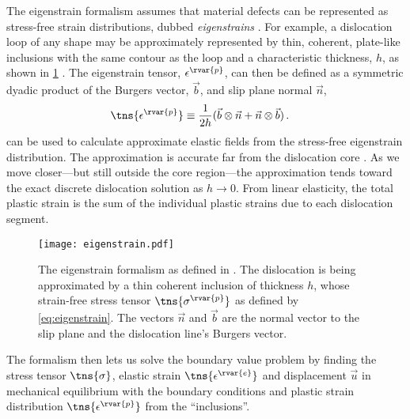 The eigenstrain formalism assumes that material defects can be represented as stress-free strain distributions, dubbed \emph{eigenstrains} \cite{eigenstrain}. For example, a dislocation loop of any shape may be approximately represented by thin, coherent, plate-like inclusions with the same contour as the loop and a characteristic thickness, $ h $, as shown in \cref{f:eigenstrain} \cite{dcm}. The eigenstrain tensor, $ \epsilon^{\rvar{p}} $, can then be defined as a symmetric dyadic product of the Burgers vector, $ \vec{b} $, and slip plane normal $ \vec{n} $,
\begin{align}\label{eq:eigenstrain}
    \tns{\epsilon^{\rvar{p}}} & \equiv \dfrac{1}{2h} (\vec{b} \otimes \vec{n} + \vec{n} \otimes \vec{b})\,.
\end{align}
 can be used to calculate approximate elastic fields from the stress-free eigenstrain distribution. The approximation is accurate far from the dislocation core \cite{dln_core}. As we move closer---but still outside the core region---the approximation tends toward the exact discrete dislocation solution as $ h \to 0$. From linear elasticity, the total plastic strain is the sum of the individual plastic strains due to each dislocation segment.
\begin{figure}
    \centering
    \texttt{[image: eigenstrain.pdf]}
    \caption[The eigenstrain formalism.]{The eigenstrain formalism as defined in \cite{eigenstrain}. The dislocation is being approximated by a thin coherent inclusion of thickness $ h $, whose strain-free stress tensor $ \tns{\sigma^{\rvar{p}}} $ as defined by \cref{eq:eigenstrain}. The vectors $ \vec{n} $ and $ \vec{b} $ are the normal vector to the slip plane and the dislocation line's Burgers vector.}
    \label{f:eigenstrain}
\end{figure}

The formalism then lets us solve the boundary value problem by finding the stress tensor $ \tns{\sigma} $, elastic strain $ \tns{\epsilon^{\rvar{e}}} $ and displacement $ \vec{u} $ in mechanical equilibrium with the boundary conditions and plastic strain distribution $ \tns{\epsilon^{\rvar{p}}} $ from the ``inclusions''.

